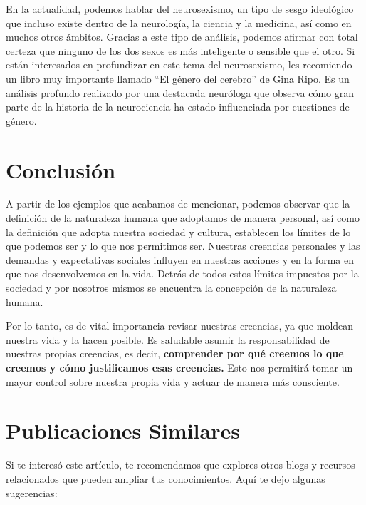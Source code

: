 \documentclass[
  jou,
  floatsintext,
  longtable,
  a4paper,
  nolmodern,
  notxfonts,
  notimes,
  12pt,
  colorlinks=true,linkcolor=blue,citecolor=blue,urlcolor=blue]{apa7}
\begin{document}
En la actualidad, podemos hablar del neurosexismo, un tipo de sesgo
ideológico que incluso existe dentro de la neurología, la ciencia y la
medicina, así como en muchos otros ámbitos. Gracias a este tipo de
análisis, podemos afirmar con total certeza que ninguno de los dos sexos
es más inteligente o sensible que el otro. Si están interesados en
profundizar en este tema del neurosexismo, les recomiendo un libro muy
importante llamado ``El género del cerebro'' de Gina Ripo. Es un
análisis profundo realizado por una destacada neuróloga que observa cómo
gran parte de la historia de la neurociencia ha estado influenciada por
cuestiones de género.

\section{Conclusión}\label{conclusiuxf3n}

A partir de los ejemplos que acabamos de mencionar, podemos observar que
la definición de la naturaleza humana que adoptamos de manera personal,
así como la definición que adopta nuestra sociedad y cultura, establecen
los límites de lo que podemos ser y lo que nos permitimos ser. Nuestras
creencias personales y las demandas y expectativas sociales influyen en
nuestras acciones y en la forma en que nos desenvolvemos en la vida.
Detrás de todos estos límites impuestos por la sociedad y por nosotros
mismos se encuentra la concepción de la naturaleza humana.

Por lo tanto, es de vital importancia revisar nuestras creencias, ya que
moldean nuestra vida y la hacen posible. Es saludable asumir la
responsabilidad de nuestras propias creencias, es decir,
\textbf{comprender por qué creemos lo que creemos y cómo justificamos
esas creencias.} Esto nos permitirá tomar un mayor control sobre nuestra
propia vida y actuar de manera más consciente.

\section{Publicaciones Similares}\label{publicaciones-similares}

Si te interesó este artículo, te recomendamos que explores otros blogs y
recursos relacionados que pueden ampliar tus conocimientos. Aquí te dejo
algunas sugerencias:
\end{document}
